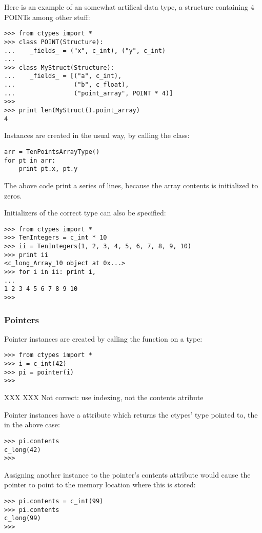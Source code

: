 Here is an example of an somewhat artifical data type, a structure
containing 4 POINTs among other stuff:
\begin{verbatim}
>>> from ctypes import *
>>> class POINT(Structure):
...    _fields_ = ("x", c_int), ("y", c_int)
...
>>> class MyStruct(Structure):
...    _fields_ = [("a", c_int),
...                ("b", c_float),
...                ("point_array", POINT * 4)]
>>>
>>> print len(MyStruct().point_array)
4
\end{verbatim}

Instances are created in the usual way, by calling the class:
\begin{verbatim}
arr = TenPointsArrayType()
for pt in arr:
    print pt.x, pt.y
\end{verbatim}

The above code print a series of  lines, because the array
contents is initialized to zeros.

Initializers of the correct type can also be specified:
\begin{verbatim}
>>> from ctypes import *
>>> TenIntegers = c_int * 10
>>> ii = TenIntegers(1, 2, 3, 4, 5, 6, 7, 8, 9, 10)
>>> print ii
<c_long_Array_10 object at 0x...>
>>> for i in ii: print i,
...
1 2 3 4 5 6 7 8 9 10
>>>
\end{verbatim}


\subsubsection{Pointers\label{ctypes-pointers}}

Pointer instances are created by calling the  function on a
 type:
\begin{verbatim}
>>> from ctypes import *
>>> i = c_int(42)
>>> pi = pointer(i)
>>>
\end{verbatim}

XXX XXX Not correct: use indexing, not the contents atribute

Pointer instances have a  attribute which returns the
ctypes' type pointed to, the  in the above case:
\begin{verbatim}
>>> pi.contents
c_long(42)
>>>
\end{verbatim}

Assigning another  instance to the pointer's contents
attribute would cause the pointer to point to the memory location
where this is stored:
\begin{verbatim}
>>> pi.contents = c_int(99)
>>> pi.contents
c_long(99)
>>>
\end{verbatim}

